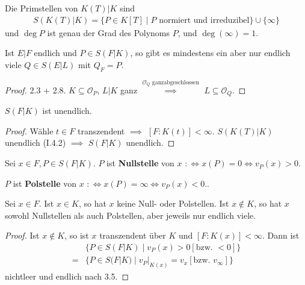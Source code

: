 \begin{beispiel}
    Die Primstellen von $K(T)|K$ sind
    \begin{align*}
        S(K(T)|K) = \{P \in K[T] \mid P \text{ normiert und irreduzibel}\} \cup \{\infty\}
    \end{align*}
    und $\deg P$ ist genau der Grad des Polynoms $P$, und $\deg(\infty) = 1.$
\end{beispiel}

\begin{lemma}
    Ist $E|F$ endlich und $P \in S(F|K)$, so gibt es mindestens ein aber nur endlich viele $Q \in S(E|L)$ mit $Q_F = P$.
\end{lemma}
\begin{proof}
    2.3 + 2.8. $K \subseteq \mathcal{O}_P$, $L|K$ ganz $\stackrel{\mathcal{O}_Q\text{ ganzabgeschlossen}}{\implies}$
    $L \subseteq \mathcal{O}_Q$.
\end{proof}

\begin{satz}
    $S(F|K)$ ist unendlich.
\end{satz}
\begin{proof}
    Wähle $t \in F$ transzendent $\implies$ $[F:K(t)] < \infty$. 
    $S(K(T)|K)$ unendlich (I.4.2) $\implies$ $S(F|K)$ unendlich.
\end{proof}

\begin{definition}
    Sei $x \in F, P \in S(F|K)$. $P$ ist \textbf{Nullstelle} von $x$ $: \iff x(P) = 0 \iff v_P(x) > 0$.

    $P$ ist \textbf{Polstelle} von $x$ $:\iff x(P) = \infty \iff v_P(x) < 0$..
\end{definition}

\begin{satz}
    Sei $x \in F$. Ist $x \in K$, so hat $x$ keine Null- oder Polstellen. Ist $x \notin K$, so hat $x$ sowohl Nullstellen als auch Polstellen,
    aber jeweils nur endlich viele.
\end{satz}
\begin{proof}
    Ist $x \notin K$, so ist $x$ transzendent über $K$ und $[F:K(x)] < \infty$.
    Dann ist 
    \begin{align*}
        &\{P \in S(F|K) \mid v_P(x) > 0 [\text{bzw. } < 0]\}\\
        =& \{P \in S(F|K) \mid v_P|_{K(x)} = v_x [\text{bzw. } v_{\infty}]\}
    \end{align*}
    nichtleer und endlich nach 3.5.
\end{proof}

